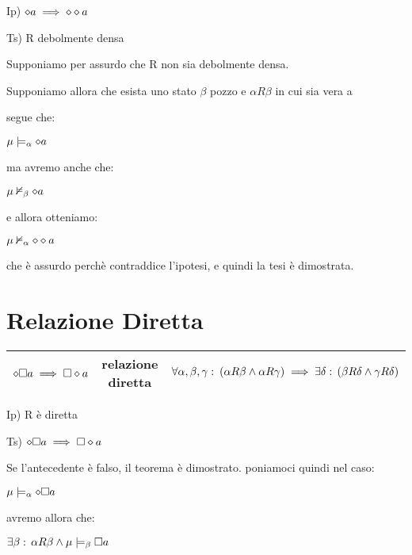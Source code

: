 Ip) $\diamond a\implies\diamond\diamond a$ 

Ts) R debolmente densa

Supponiamo per assurdo che R non sia debolmente densa.

Supponiamo allora che esista uno stato $\beta$ pozzo e $\alpha R\beta$
in cui sia vera a

segue che:

$\mu\models_{\alpha}\diamond a$

ma avremo anche che:

$\mu\nvDash_{\beta}\diamond a$

e allora otteniamo:

$\mu\nvDash_{\alpha}\diamond\diamond a$

che è assurdo perchè contraddice l'ipotesi, e quindi la tesi è dimostrata.

\begin{center} 
\end{center}


\section{Relazione Diretta}

\begin{tabular}{|c|c|c|}
\hline 
$\diamond\square a\implies\square\diamond a$  & relazione diretta  & $\forall\alpha,\beta,\gamma:\:(\alpha R\beta\wedge\alpha R\gamma)\implies\exists\delta:\,(\beta R\delta\wedge\gamma R\delta)$\tabularnewline
\hline 
\end{tabular}

Ip) R è diretta

Ts) $\diamond\square a\implies\square\diamond a$ 

Se l'antecedente è falso, il teorema è dimostrato. poniamoci quindi
nel caso:

$\mu\models_{\alpha}\diamond\square a$

avremo allora che:

$\exists\beta:\,\alpha R\beta\wedge\mu\models_{\beta}\square a$

